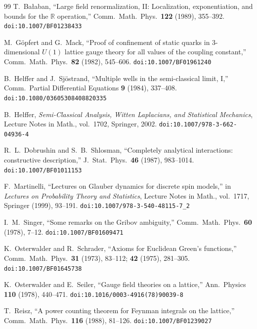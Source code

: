\documentclass[11pt]{article}
\theoremstyle{definition}
\newcommand{\R}{\mathbb{R}}
\begin{document}
\begin{thebibliography}{99}
 T.~Ba{\l}aban,
  ``Large field renormalization, II:
  Localization, exponentiation, and bounds for the
  $\R$ operation,''
  Comm.\ Math.\ Phys.\ \textbf{122} (1989), 355--392.
  \texttt{doi:10.1007/BF01238433}

 M.~G\"opfert and G.~Mack,
  ``Proof of confinement of static quarks in 3-dimensional
  $U(1)$ lattice gauge theory for all values of the
  coupling constant,''
  Comm.\ Math.\ Phys.\ \textbf{82} (1982), 545--606.
  \texttt{doi:10.1007/BF01961240}

 B.~Helffer and J.~Sj\"ostrand,
  ``Multiple wells in the semi-classical limit, I,''
  Comm.\ Partial Differential Equations \textbf{9}
  (1984), 337--408.
  \texttt{doi:10.1080/03605308408820335}

 B.~Helffer,
  \emph{Semi-Classical Analysis, Witten Laplacians,
  and Statistical Mechanics},
  Lecture Notes in Math., vol.~1702, Springer, 2002.
  \texttt{doi:10.1007/978-3-662-04936-4}

 R.~L.~Dobrushin and
  S.~B.~Shlosman,
  ``Completely analytical interactions:
  constructive description,''
  J.~Stat.\ Phys.\ \textbf{46} (1987), 983--1014.
  \texttt{doi:10.1007/BF01011153}

 F.~Martinelli,
  ``Lectures on Glauber dynamics for discrete spin
  models,''
  in \emph{Lectures on Probability Theory and Statistics},
  Lecture Notes in Math., vol.~1717, Springer (1999),
  93--191.
  \texttt{doi:10.1007/978-3-540-48115-7\_2}

 I.~M.~Singer,
  ``Some remarks on the Gribov ambiguity,''
  Comm.\ Math.\ Phys.\ \textbf{60} (1978), 7--12.
  \texttt{doi:10.1007/BF01609471}

 K.~Osterwalder and
  R.~Schrader,
  ``Axioms for Euclidean Green's functions,''
  Comm.\ Math.\ Phys.\ \textbf{31} (1973), 83--112;
  \textbf{42} (1975), 281--305.
  \texttt{doi:10.1007/BF01645738}

 K.~Osterwalder and
  E.~Seiler,
  ``Gauge field theories on a lattice,''
  Ann.\ Physics \textbf{110} (1978), 440--471.
  \texttt{doi:10.1016/0003-4916(78)90039-8}

 T.~Reisz,
  ``A power counting theorem for Feynman integrals
  on the lattice,''
  Comm.\ Math.\ Phys.\ \textbf{116} (1988), 81--126.
  \texttt{doi:10.1007/BF01239027}


\end{thebibliography}
\end{document}
